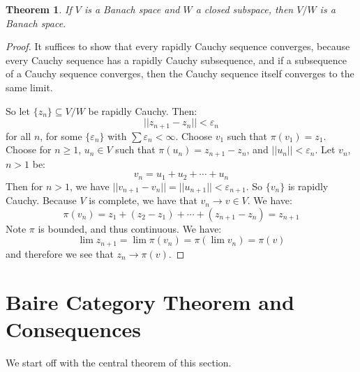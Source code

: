 \documentclass[a4paper,12pt]{report}
\newcommand{\varep}{ \varepsilon }
\newcommand{\sse} {\subseteq}
\newtheorem{theorem}{Theorem}[section]
\begin{document}
	\begin{theorem}
	If $V$ is a Banach space and $W$ a closed subspace, then $V / W$ is a Banach space.
	\end{theorem}
	\begin{proof}
	It suffices to show that every rapidly Cauchy sequence converges, because every Cauchy sequence has a rapidly Cauchy subsequence, and if a subsequence of a Cauchy sequence converges, then the Cauchy sequence itself converges to the same limit.
	
	So let $\{z_n\} \sse V / W$ be rapidly Cauchy. Then:
	\[ ||z_{n+1} - z_n|| < \varep_n \]
	for all $n$, for some $\{\varep_n\}$ with $\sum \varep_n < \infty$.
	Choose $v_1$ such that $\pi(v_1) = z_1$. Choose for $n \geq 1$, $u_n \in V$ such that $\pi(u_n) = z_{n+1} - z_n$, and $||u_n|| < \varep_n$. Let $v_n$, $n > 1$ be:
	\[ v_n = u_1 + u_2 + \cdots + u_n \]
	Then for $n > 1$, we have $||v_{n+1} - v_n|| = ||u_{n+1}|| < \varep_{n+1}$. So $\{v_n\}$ is rapidly Cauchy. Because $V$ is complete, we have that $v_n \rightarrow v \in V$. We have:
	\[ \pi(v_n) = z_1 + (z_2 - z_1) + \cdots +(z_{n+1} - z_n) = z_{n+1} \]
	Note $\pi$ is bounded, and thus continuous. We have:
	\[ \lim z_{n+1} = \lim \pi(v_n) = \pi \left(\lim v_n \right) = \pi(v) \]
	and therefore we see that $z_n \rightarrow \pi(v)$.
	\end{proof}
	
	\section{Baire Category Theorem and Consequences}
	
	We start off with the central theorem of this section.
	
\end{document}

